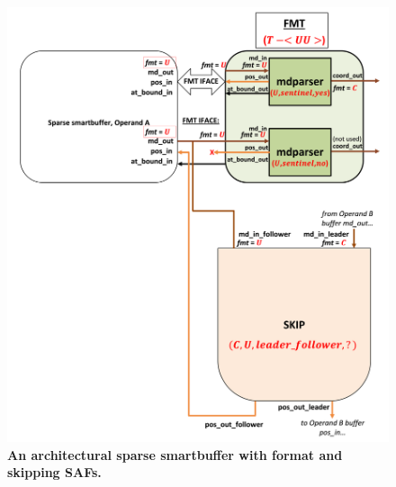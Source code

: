 \begin{figure}[ht]
\includegraphics[width=\textwidth]{figures/safinference_build_09skipfmtattrs.png}
\caption{\textbf{An architectural sparse smartbuffer with format and skipping SAFs.}}
\label{fig:safinference_build_09skipfmtattrs}
\centering
\end{figure}



